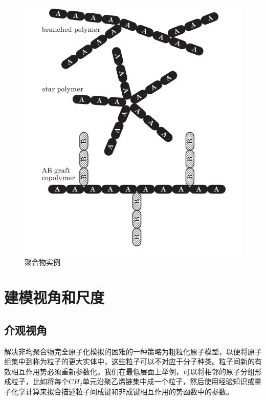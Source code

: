 \begin{figure}[h]
	\centering
	\includegraphics[scale=0.5
	]{Contents/chapter1/figures/1-2.png}
	\caption{聚合物实例}
\end{figure}

\section{建模视角和尺度}

\subsection{介观视角}

解决非均聚合物完全原子化模拟的困难的一种策略为粗粒化原子模型，以便将原子组集中到称为粒子的更大实体中，这些粒子可以不对应于分子种类。粒子间新的有效相互作用势必须重新参数化。我们在最低层面上举例，可以将相邻的原子分组形成粒子，比如将每个$CH_2$单元沿聚乙烯链集中成一个粒子，然后使用经验知识或量子化学计算来拟合描述粒子间成键和非成键相互作用的势函数中的参数。


